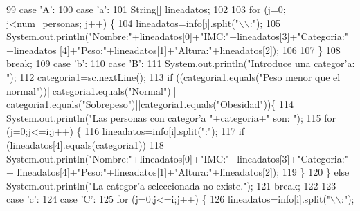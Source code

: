 \begin{DoxyCode}
99             \textcolor{keywordflow}{case} \textcolor{charliteral}{'A'}:
100             \textcolor{keywordflow}{case} \textcolor{charliteral}{'a'}:
101         String[] lineadatos;
102                             
103                 \textcolor{keywordflow}{for} (j=0; j<num\_personas; j++) \{
104                     lineadatos=info[j].split(\textcolor{stringliteral}{"\(\backslash\)\(\backslash\):"});
105                     System.out.println(\textcolor{stringliteral}{"Nombre:"}+lineadatos[0]+\textcolor{stringliteral}{"IMC:"}+lineadatos[3]+\textcolor{stringliteral}{"Categoria:"}+lineadatos
      [4]+\textcolor{stringliteral}{"Peso:"}+lineadatos[1]+\textcolor{stringliteral}{"Altura:"}+lineadatos[2]);
106                     
107                 \}
108                 \textcolor{keywordflow}{break};
109             \textcolor{keywordflow}{case} \textcolor{charliteral}{'b'}:
110             \textcolor{keywordflow}{case} \textcolor{charliteral}{'B'}:
111                 System.out.println(\textcolor{stringliteral}{"Introduce una categor’a: "});
112                 categoria1=sc.nextLine();
113                 \textcolor{keywordflow}{if} ((categoria1.equals(\textcolor{stringliteral}{"Peso menor que el normal"}))||categoria1.equals(\textcolor{stringliteral}{"Normal"})||
      categoria1.equals(\textcolor{stringliteral}{"Sobrepeso"})||categoria1.equals(\textcolor{stringliteral}{"Obesidad"}))\{
114                     System.out.println(\textcolor{stringliteral}{"Las personas con categor’a "}+categoria+\textcolor{stringliteral}{" son: "});
115                     \textcolor{keywordflow}{for} (j=0;j<=i;j++) \{
116                         lineadatos=info[i].split(\textcolor{stringliteral}{":"});
117                         \textcolor{keywordflow}{if} (lineadatos[4].equals(categoria1))
118                             System.out.println(\textcolor{stringliteral}{"Nombre:"}+lineadatos[0]+\textcolor{stringliteral}{"IMC:"}+lineadatos[3]+\textcolor{stringliteral}{"Categoria:"}+
      lineadatos[4]+\textcolor{stringliteral}{"Peso:"}+lineadatos[1]+\textcolor{stringliteral}{"Altura:"}+lineadatos[2]);
119                     \}
120                 \} \textcolor{keywordflow}{else} System.out.println(\textcolor{stringliteral}{"La categor’a seleccionada no existe."});
121                 \textcolor{keywordflow}{break};
122             
123             \textcolor{keywordflow}{case} \textcolor{charliteral}{'c'}:
124             \textcolor{keywordflow}{case} \textcolor{charliteral}{'C'}:
125                 \textcolor{keywordflow}{for} (j=0;j<=i;j++) \{
126                     lineadatos=info[i].split(\textcolor{stringliteral}{"\(\backslash\)\(\backslash\):"});

\end{DoxyCode}
